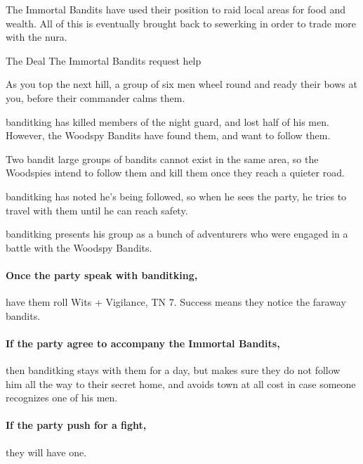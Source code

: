 \begin{multicols}{2}
The Immortal Bandits have used their position to raid local areas for food and wealth.
All of this is eventually brought back to \gls{sewerking} in order to trade more with the nura.

{The Deal}%
{The Immortal Bandits request help}%

\begin{boxtext}

	As you top the next hill, a group of six men wheel round and ready their bows at you, before their commander calms them.

\end{boxtext}

\begin{exampletext}

	\Gls{banditking} has killed members of the night guard, and lost half of his men.
	However, the Woodspy Bandits have found them, and want to follow them.

	Two bandit large groups of bandits cannot exist in the same area, so the Woodspies intend to follow them and kill them once they reach a quieter road.

	\Gls{banditking} has noted he's being followed, so when he sees the party, he tries to travel with them until he can reach safety.

\end{exampletext}

\noindent
\Gls{banditking} presents his group as a bunch of adventurers who were engaged in a battle with the Woodspy Bandits.

\paragraph{Once the party speak with \gls{banditking},}
have them roll Wits + Vigilance, TN 7.
Success means they notice the faraway bandits.

\paragraph{If the party agree to accompany the Immortal Bandits,}
then \gls{banditking} stays with them for a day, but makes sure they do not follow him all the way to their secret home, and avoids town at all cost in case someone recognizes one of his men.

\paragraph{If the party push for a fight,}
they will have one.


\end{multicols}
